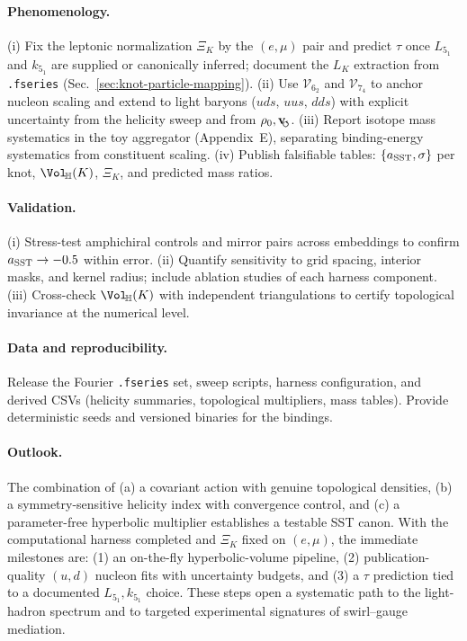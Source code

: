 \documentclass[preprint,titlepage]{revtex4-2}
\newcommand{\swirlarrow}{\!\!\scriptsize\boldsymbol{\circlearrowleft}}
\newcommand{\vswirl}{\mathbf{v}_{\swirlarrow}}
\begin{document}
    \paragraph{Phenomenology.}
    (i) Fix the leptonic normalization \(\Xi_K\) by the \((e,\mu)\) pair and predict \(\tau\) once \(L_{5_1}\) and \(k_{5_1}\) are supplied or canonically inferred; document the \(L_K\) extraction from \texttt{.fseries} (Sec.~\ref{sec:knot-particle-mapping}).
    (ii) Use \(\mathcal{V}_{6_2}\) and \(\mathcal{V}_{7_4}\) to anchor nucleon scaling and extend to light baryons (\(uds,\,uus,\,dds\)) with explicit uncertainty from the helicity sweep and from \(\rho_0,\vswirl\).
    (iii) Report isotope mass systematics in the toy aggregator (Appendix~E), separating binding-energy systematics from constituent scaling.
    (iv) Publish falsifiable tables: \(\{a_{\rm SST},\sigma\}\) per knot, \(\Vol_{\!\mathbb{H}}(K)\), \(\Xi_K\), and predicted mass ratios.

    \paragraph{Validation.}
    (i) Stress-test amphichiral controls and mirror pairs across embeddings to confirm \(a_{\rm SST}\rightarrow -0.5\) within error.
    (ii) Quantify sensitivity to grid spacing, interior masks, and kernel radius; include ablation studies of each harness component.
    (iii) Cross-check \(\Vol_{\!\mathbb{H}}(K)\) with independent triangulations to certify topological invariance at the numerical level.

    \paragraph{Data and reproducibility.}
    Release the Fourier \texttt{.fseries} set, sweep scripts, harness configuration, and derived CSVs (helicity summaries, topological multipliers, mass tables). Provide deterministic seeds and versioned binaries for the bindings.

    \paragraph{Outlook.}
    The combination of (a) a covariant action with genuine topological densities, (b) a symmetry-sensitive helicity index with convergence control, and (c) a parameter-free hyperbolic multiplier establishes a testable SST canon. With the computational harness completed and \(\Xi_K\) fixed on \((e,\mu)\), the immediate milestones are: (1) an on-the-fly hyperbolic-volume pipeline, (2) publication-quality \((u,d)\) nucleon fits with uncertainty budgets, and (3) a \(\tau\) prediction tied to a documented \(L_{5_1},k_{5_1}\) choice. These steps open a systematic path to the light-hadron spectrum and to targeted experimental signatures of swirl–gauge mediation.
\end{document}
